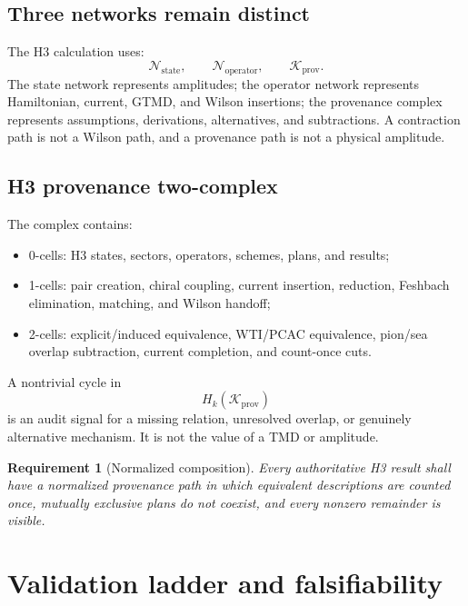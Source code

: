 \documentclass[11pt]{article}
\newtheorem{requirement}[definition]{Requirement}
\newcommand{\cK}{\mathcal K}
\newcommand{\cN}{\mathcal N}
\begin{document}
\subsection{Three networks remain distinct}

The H3 calculation uses:
\begin{equation}
 \cN_{\mathrm{state}},
 \qquad
 \cN_{\mathrm{operator}},
 \qquad
 \cK_{\mathrm{prov}}.
\end{equation}
The state network represents amplitudes; the operator network represents
Hamiltonian, current, GTMD, and Wilson insertions; the provenance complex
represents assumptions, derivations, alternatives, and subtractions.
A contraction path is not a Wilson path, and a provenance path is not a
physical amplitude.

\subsection{H3 provenance two-complex}

The complex contains:
\begin{itemize}
 \item 0-cells: H3 states, sectors, operators, schemes, plans, and results;
 \item 1-cells: pair creation, chiral coupling, current insertion, reduction,
       Feshbach elimination, matching, and Wilson handoff;
 \item 2-cells: explicit/induced equivalence, WTI/PCAC equivalence,
       pion/sea overlap subtraction, current completion, and count-once cuts.
\end{itemize}
A nontrivial cycle in
\begin{equation}
 H_k(\cK_{\mathrm{prov}})
\end{equation}
is an audit signal for a missing relation, unresolved overlap, or genuinely
alternative mechanism.  It is not the value of a TMD or amplitude.

\begin{requirement}[Normalized composition]
Every authoritative H3 result shall have a normalized provenance path in
which equivalent descriptions are counted once, mutually exclusive plans do
not coexist, and every nonzero remainder is visible.
\end{requirement}

\section{Validation ladder and falsifiability}
\label{sec:validation}
\end{document}

